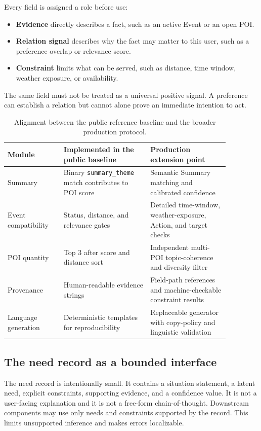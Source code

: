 \documentclass[10pt]{article}
\begin{document}
Every field is assigned a role before use:
\begin{itemize}
  \item \textbf{Evidence} directly describes a fact, such as an active Event or an open POI.
  \item \textbf{Relation signal} describes why the fact may matter to this user, such as a preference overlap or relevance score.
  \item \textbf{Constraint} limits what can be served, such as distance, time window, weather exposure, or availability.
\end{itemize}
The same field must not be treated as a universal positive signal. A preference can establish a relation but cannot alone prove an immediate intention to act.

\begin{table}[t]
\centering
\small
\caption{Alignment between the public reference baseline and the broader production protocol.}
\label{tab:alignment}
\begin{tabular}{P{0.22\linewidth}P{0.34\linewidth}P{0.31\linewidth}}
\toprule
Module & Implemented in the public baseline & Production extension point \\
\midrule
Summary & Binary \texttt{summary\_theme} match contributes to POI score & Semantic Summary matching and calibrated confidence \\
Event compatibility & Status, distance, and relevance gates & Detailed time-window, weather-exposure, Action, and target checks \\
POI quantity & Top 3 after score and distance sort & Independent multi-POI topic-coherence and diversity filter \\
Provenance & Human-readable evidence strings & Field-path references and machine-checkable constraint results \\
Language generation & Deterministic templates for reproducibility & Replaceable generator with copy-policy and linguistic validation \\
\bottomrule
\end{tabular}
\end{table}

\subsection{The need record as a bounded interface}

The need record is intentionally small. It contains a situation statement, a latent need, explicit constraints, supporting evidence, and a confidence value. It is not a user-facing explanation and it is not a free-form chain-of-thought. Downstream components may use only needs and constraints supported by the record. This limits unsupported inference and makes errors localizable.
\end{document}
